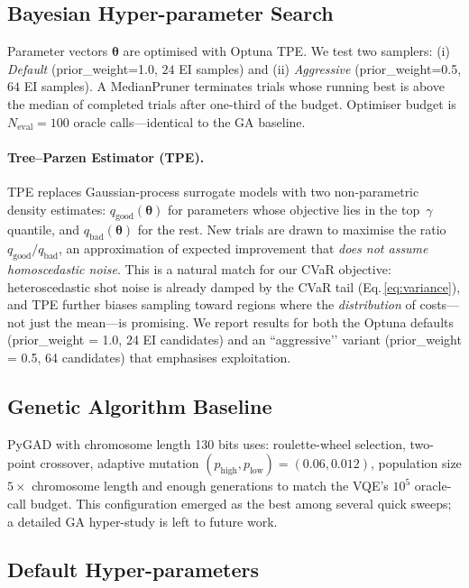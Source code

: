 \subsection{Bayesian Hyper-parameter Search}\label{sec:bo}

Parameter vectors \(\boldsymbol{\theta}\) are optimised with
Optuna TPE\cite{akiba2019optuna}.
We test two samplers:
(i) \emph{Default} (prior\_weight=1.0, $24$ EI samples) and
(ii) \emph{Aggressive} (prior\_weight=0.5, $64$ EI samples).
A MedianPruner terminates trials whose running best is above the median
of completed trials after one-third of the budget.
Optimiser budget is \(N_{\text{eval}}=100\) oracle calls—identical to
the GA baseline.

\paragraph{Tree–Parzen Estimator (TPE).}
TPE replaces Gaussian-process surrogate models with two
non-parametric density estimates:
$q_{\text{good}}(\boldsymbol{\theta})$ for parameters whose
objective lies in the top~$\gamma$ quantile,
and $q_{\text{bad}}(\boldsymbol{\theta})$ for the rest.
New trials are drawn to maximise the ratio
$q_{\text{good}}/q_{\text{bad}}$, an approximation of expected
improvement that \emph{does not assume homoscedastic noise}.
This is a natural match for our CVaR objective:
heteroscedastic shot noise is already damped by the CVaR tail
(Eq.\,\ref{eq:variance}), and TPE further biases sampling toward
regions where the \emph{distribution} of costs—not just the mean—is
promising.
We report results for both the Optuna defaults
(prior\_weight = 1.0, 24 EI candidates) and an ``aggressive’’ variant
(prior\_weight = 0.5, 64 candidates) that emphasises exploitation.


\subsection{Genetic Algorithm Baseline}

PyGAD with chromosome length 130 bits uses:
roulette-wheel selection, two-point crossover,
adaptive mutation \((p_{\text{high}},p_{\text{low}})=(0.06,0.012)\),
population size $5\times$ chromosome length
and enough generations to match the VQE’s
\(10^{5}\) oracle-call budget.
This configuration emerged as the best among several quick sweeps; a
detailed GA hyper-study is left to future work.

\subsection{Default Hyper-parameters}

